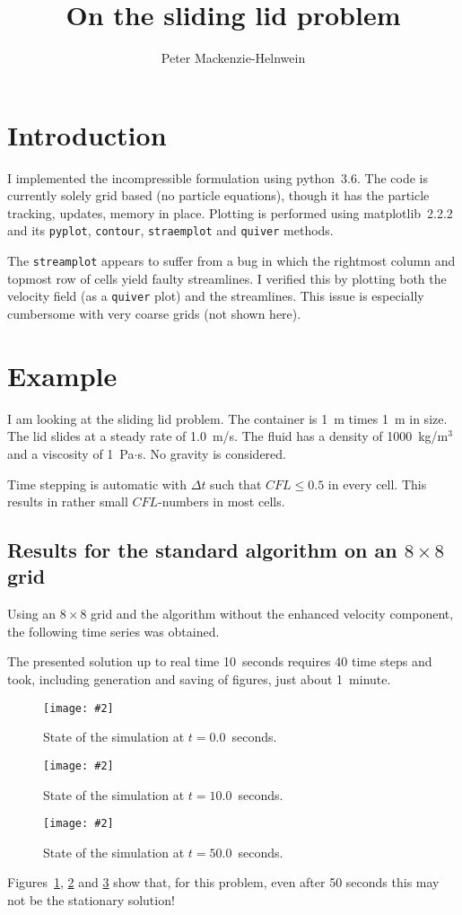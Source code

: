 \documentclass[11pt, oneside]{article}   	%
\title{On the sliding lid problem}
\author{Peter Mackenzie-Helnwein}
\newcommand{\figref}[1]{\ref{fig:#1}}
\newcommand{\TheScaledTimeStep}[4]{%
\begin{figure}[htb]
	\centering
	\texttt{[image: \#2]}
	\caption{State of the simulation at $t = #3$~seconds.}
	\label{fig:#4}
\end{figure}}
\begin{document}
\maketitle

\section{Introduction}
I implemented the incompressible formulation using python~3.6.  The code is currently solely grid based (no particle equations), though it has the particle tracking, updates, memory in place.
Plotting is performed using matplotlib~2.2.2 and its \verb+pyplot+, \verb+contour+, \verb+straemplot+ and \verb+quiver+ methods.

The \verb+streamplot+ appears to suffer from a bug in which the rightmost column and topmost row of cells yield faulty streamlines.  I verified this by plotting both the velocity field (as a \verb+quiver+ plot) and the streamlines.  This issue is especially cumbersome with very coarse grids (not shown here).

\section{Example}
I am looking at the sliding lid problem.  The container is 1~m times 1~m in size.  The lid slides at a steady rate of 1.0~m/s.
The fluid has a density of 1000~kg/m$^3$ and a viscosity of 1~Pa$\cdot$s.  No gravity is considered.

Time stepping is automatic with $\Delta t$ such that $CFL\le 0.5$ in every cell.  This results in rather small $CFL$-numbers in most cells.

\subsection{Results for the standard algorithm on an $8\times8$ grid}
Using an $8\times8$ grid and the algorithm without the enhanced velocity component, the following time series was obtained.

The presented solution up to real time 10~seconds requires 40 time steps and took, including generation and saving of figures, just about 1~minute.   

\TheScaledTimeStep{0.35}{8x8/Stream000.png}{0.0}{t01}
\TheScaledTimeStep{0.35}{8x8/Stream020.png}{10.0}{t02}
\TheScaledTimeStep{0.35}{8x8/Stream028.png}{50.0}{t03}

Figures~\figref{t01}, \figref{t02} and \figref{t03} show that, for this problem, even after 50 seconds this may not be the stationary solution!
\end{document}

